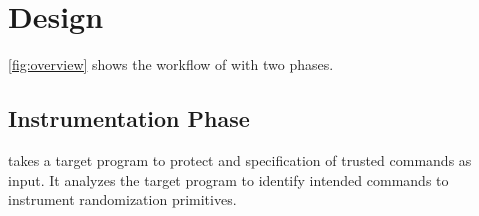 
\section{Design}
\label{sec:design}
\autoref{fig:overview} shows the workflow of \sysname with two phases. %

\subsection{Instrumentation Phase}
\label{subsec:instrumentation_phase}
\sysname takes a target program to protect and specification of trusted commands as input. It  analyzes the target program to identify intended commands to instrument randomization primitives. %

%
%





